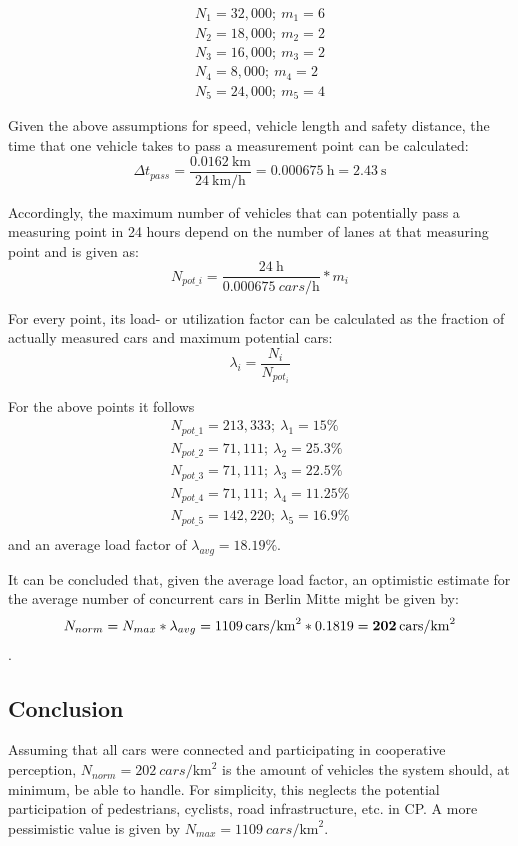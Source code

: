 \begin{gather*}
N_1 = 32,000; \  m_1 = 6 \\
N_2 = 18,000; \  m_2 = 2 \\
N_3 = 16,000; \  m_3 = 2 \\
N_4 = 8,000; \  m_4 = 2 \\
N_5 = 24,000; \  m_5 = 4
\end{gather*}

Given the above assumptions for speed, vehicle length and safety distance, the time that one vehicle takes to pass a measurement point can be calculated: $$\Delta t_{pass} = \frac{\SI{0.0162}{\km}}{\SI{24}{\km\per\hour}} = \SI{0.000675}{\hour} = \SI{2.43}{\second}$$

Accordingly, the maximum number of vehicles that can potentially pass a measuring point in 24 hours depend on the number of lanes at that measuring point and is given as: $$N_{pot\_i} = \frac{\SI{24}{\hour}}{\SI{0.000675}{cars\per\hour}} * m_i$$

For every point, its load- or utilization factor can be calculated as the fraction of actually measured cars and maximum potential cars: $$\lambda_i = \frac{N_i}{N_{pot_i}}$$

For the above points it follows
\begin{gather*}
N_{pot\_1} = 213,333; \  \lambda_1 = 15 \% \\
N_{pot\_2} = 71,111; \  \lambda_2 = 25.3 \% \\
N_{pot\_3} = 71,111; \  \lambda_3 = 22.5 \% \\
N_{pot\_4} = 71,111; \  \lambda_4 = 11.25 \% \\
N_{pot\_5} = 142,220; \  \lambda_5 = 16.9 \% \\
\end{gather*}
and an average load factor of $\lambda_{avg} = 18.19 \%$.

It can be concluded that, given the average load factor, an optimistic estimate for the average number of concurrent cars in Berlin Mitte might be given by: $$N_{norm} = N_{max} * \lambda_{avg} = \SI[detect-weight]{1109}{cars\per\square\km} * 0.1819 = \textbf{\SI[detect-weight]{202}{cars\per\square\km}}$$.

\subsection{Conclusion}
\label{subsec:problem_analysis:conclusion}
Assuming that all cars were connected and participating in cooperative perception, \textbf{$N_{norm} = \SI[detect-weight]{202}{cars\per\square\km}$} is the amount of vehicles the system should, at minimum, be able to handle. For simplicity, this neglects the potential participation of pedestrians, cyclists, road infrastructure, etc. in CP. A more pessimistic value is given by \textbf{$N_{max} = \SI[detect-weight]{1109}{cars\per\square\km}$}.

